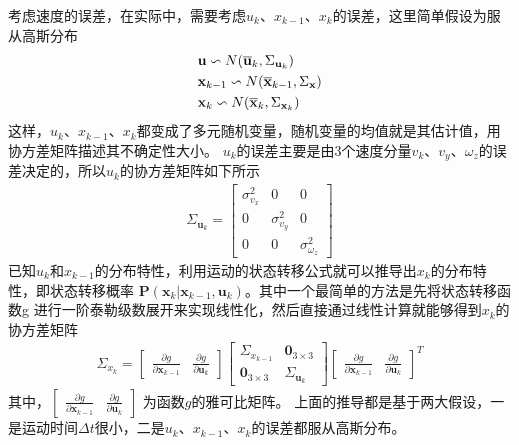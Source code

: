 \documentclass[10pt]{article}
\begin{document}
考虑速度的误差，在实际中，需要考虑$u_{k}、x_{k-1}、x_{k}$的误差，这里简单假设为服从高斯分布
\begin{align} 
    &\mathbf{u} \backsim N(\overline{\mathbf{u}}_{k},\Sigma_{\mathbf{u}_{k}}) \notag\\
    &\mathbf{x}_{k-1} \backsim N(\overline{\mathbf{x}}_{k-1},\Sigma_{\mathbf{x}}) \\
    &\mathbf{x}_{k} \backsim N(\overline{\mathbf{x}}_{k},\Sigma_{\mathbf{x}_{k}}) \notag
\end{align}
这样，$u_{k}、x_{k-1}、x_{k}$都变成了多元随机变量，随机变量的均值就是其估计值，用协方差矩阵描述其不确定性大小。
$u_{k}$的误差主要是由3个速度分量$v_{k}、v_{y}、\omega_{z}$的误差决定的，所以$u_{k}$的协方差矩阵如下所示
\begin{align} 
    \Sigma_{\mathbf{u}_{k}}=\left[\begin{array}{ccc}\sigma_{v_{x}}^{2} & 0 & 0 \\
        0 & \sigma_{v_{y}}^{2} & 0 \\ 0 & 0 & \sigma_{\omega_{z}}^{2}\end{array}\right]  
    \end{align}
已知$u_{k}$和$x_{k-1}$的分布特性，利用运动的状态转移公式就可以推导出$x_{k}$的分布特性，即状态转移概率
$\mathbf{P}(\mathbf{x}_k|\mathbf{x}_{k-1},\mathbf{u}_k)$。其中一个最简单的方法是先将状态转移函数g
进行一阶泰勒级数展开来实现线性化，然后直接通过线性计算就能够得到$x_{k}$的协方差矩阵
\begin{align}
    \Sigma_{x_{k}}=\left[\begin{array}{cc}\frac{\partial g}{\partial \mathbf{x}_{k-1}} & 
        \frac{\partial g}{\partial \mathbf{u}_k}\end{array}\right]
        \left[\begin{array}{cc}\Sigma_{x_{k-1}} & \mathbf{0}_{3 \times 3}\\
            \mathbf{0}_{3\times 3} & \Sigma_{\mathbf{u}_k}\end{array}\right]
        \left[\begin{array}{cc}\frac{\partial g}{\partial \mathbf{x}_{k-1}} & 
        \frac{\partial g}{\partial \mathbf{u}_k}\end{array}\right]^{T}
\end{align} 
其中，$\left[\begin{array}{cc}\frac{\partial g}{\partial \mathbf{x}_{k-1}} & \frac{\partial g}{\partial \mathbf{u}_k}\end{array}\right]$
为函数$g$的雅可比矩阵。
上面的推导都是基于两大假设，一是运动时间$\Delta t$很小，二是$u_k、x_{k-1}、x_{k}$的误差都服从高斯分布。
\end{document}
